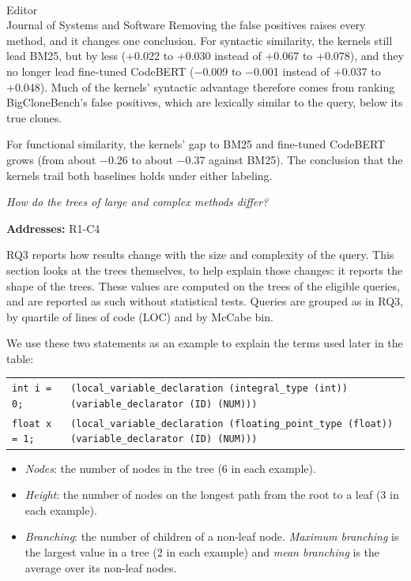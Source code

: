 \documentclass[
pagenumber=false, %
parskip=half, %
fromalign=right, %
foldmarks=false, %
addrfield=false %
]{scrlttr2}
\newcounter{rqsec}\renewcommand{\therqsec}{\Alph{rqsec}}
\newcommand{\rqsection}[2]{\clearpage\refstepcounter{rqsec}{\large\textbf{\therqsec.~#1}}\par\noindent\emph{#2}\par\medskip}
\newcommand{\addresses}[1]{\noindent\textbf{Addresses:} #1\par\medskip}
\begin{document}
\begin{letter}{\\Editor\\Journal of Systems and Software}
Removing the false positives raises every method, and it changes one conclusion. For syntactic
similarity, the kernels still lead BM25, but by less (+0.022 to +0.030 instead of +0.067 to +0.078), and they no longer lead fine-tuned CodeBERT ($-$0.009 to $-$0.001 instead of +0.037 to +0.048). Much of the kernels' syntactic advantage therefore comes from ranking BigCloneBench's false positives,
which are lexically similar to the query, below its true clones. 

For functional similarity, the kernels' gap to BM25 and fine-tuned CodeBERT grows (from about $-$0.26 to about $-$0.37 against BM25). The conclusion that the kernels trail both baselines holds under either labeling. 


\rqsection{Diagnostics}{
	How do the trees of large and complex methods differ?}\label{sec:diagnostics}
\addresses{R1-C4}

\noindent RQ3 reports how results change with the size and complexity of the query. This
section looks at the trees themselves, to help explain those changes: it reports the shape of the trees. These
values are computed on the trees of the eligible queries, and are reported as such without statistical tests.
Queries are grouped as in RQ3, by quartile of lines of code (LOC) and by McCabe bin.

\noindent We use these two statements as an example to explain the terms used later in the table:
\begin{center}\scriptsize\begin{tabular}{ll}
\texttt{int i = 0;} & \texttt{(local\_variable\_declaration (integral\_type (int)) (variable\_declarator (ID) (NUM)))} \\ \newline
\texttt{float x = 1;} & \texttt{(local\_variable\_declaration (floating\_point\_type (float)) (variable\_declarator (ID) (NUM)))} \\
\end{tabular}\end{center}
\begin{itemize}
\item \emph{Nodes}: the number of nodes in the tree (6 in each example).
\item \emph{Height}: the number of nodes on the longest path from the root to a leaf (3 in each example).
\item \emph{Branching}: the number of children of a non-leaf node. \emph{Maximum branching} is the largest value in a tree
(2 in each example) and \emph{mean branching} is the average over its non-leaf nodes.
\end{itemize}


\end{letter}
\end{document}
